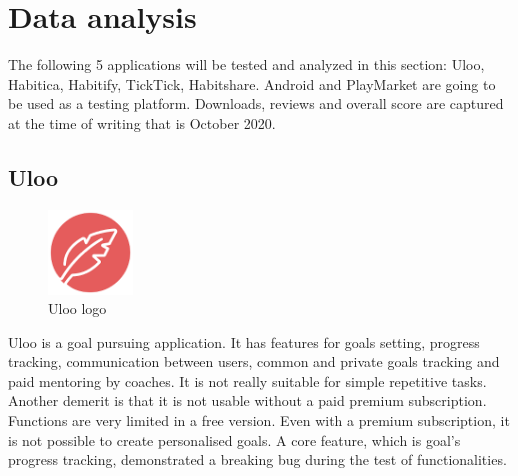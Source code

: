 \section{Data analysis}\label{sec:data-analysis}

The following 5 applications will be tested and analyzed in this section: Uloo, Habitica, Habitify, TickTick, Habitshare.
Android and PlayMarket are going to be used as a testing platform.
Downloads, reviews and overall score are captured at the time of writing that is October 2020.

\subsection{Uloo}\label{subsec:uloo}

\begin{figure}[h!]
    \includegraphics[width=0.20\textwidth]{images/uloo-logo}
    \caption{Uloo logo~\cite{uloo-logo}}
    \label{fig:uloo-logo}
\end{figure}

Uloo is a goal pursuing application.
It has features for goals setting, progress tracking, communication between users, common and private goals tracking and paid mentoring by coaches.
It is not really suitable for simple repetitive tasks.
Another demerit is that it is not usable without a paid premium subscription.
Functions are very limited in a free version.
Even with a premium subscription, it is not possible to create personalised goals.
A core feature, which is goal's progress tracking, demonstrated a breaking bug during the test of functionalities.

